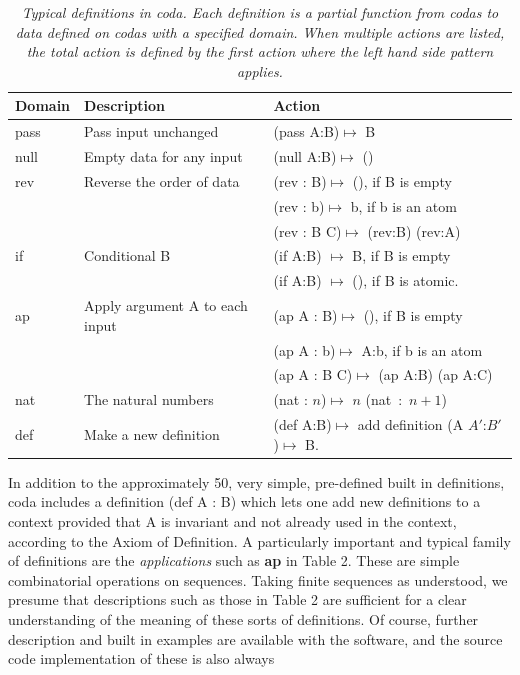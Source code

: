 \documentclass[11pt]{article}
\begin{document}
\begin{table}
\begin{tabular}{ | l | l | l | }
Domain & Description & Action \\
\hline
pass & Pass input unchanged & (pass A:B)$\mapsto$ B \\
\hline
null & Empty data for any input & (null A:B)$\mapsto$ () \\
\hline
rev & Reverse the order of data & (rev : B)$\mapsto$ (), if B is empty \\
 &  & (rev : b)$\mapsto$ b, if b is an atom \\
 & & (rev : B C)$\mapsto$ (rev:B) (rev:A) \\ 
 \hline
 if & Conditional B & (if A:B) $\mapsto$ B, if B is empty \\
 & & (if A:B) $\mapsto$ (), if B is atomic. \\
 \hline 
 ap & Apply argument A to each input & (ap A : B)$\mapsto$ (), if B is empty \\
  & & (ap A : b)$\mapsto$ A:b, if b is an atom \\
  & & (ap A : B C)$\mapsto$ (ap A:B) (ap A:C) \\  
\hline
nat & The natural numbers & (nat : $n$)$\mapsto$ $n$ (nat\ :\ $n+1$) \\
\hline
def & Make a new definition & (def A:B)$\mapsto$ add definition (A $A'$:$B'$)$\mapsto$ B. \\
\hline 
\end{tabular}
\caption{\label{ }{\it Typical definitions in coda.  Each definition is a partial function from codas to data defined on  
codas with a specified domain.  When multiple actions are listed, the total action is defined by the first action 
where the left hand side pattern applies.}}
\end{table}
In addition to the approximately 50, very simple, pre-defined built in definitions, coda includes a definition (def A : B) which lets one 
add new definitions to a context provided that A is invariant and not already used in the context, according to the Axiom of Definition.
A particularly important and typical family of definitions are the {\it applications} such as {\bf ap} in Table 2.  These 
are simple combinatorial operations on sequences.  Taking finite sequences as understood, we presume that descriptions 
such as those in Table 2 are sufficient for a clear understanding of the meaning of these sorts of definitions.  Of course, further description and built in examples are available with the software, and the source code implementation of these is also always 
\end{document}
